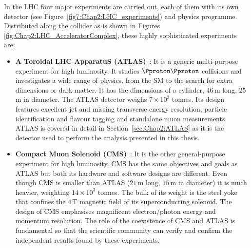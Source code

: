 In the LHC four major experiments are carried out, each of them with its own detector (see Figure~\ref{fig7:Chap2:LHC_experiments})
and physics programme.
Distributed along the collider as is shown in Figures \ref{fig:Chap2:LHC_AcceleratorComplex}, 
these highly sophisticated experiments are:
\begin{itemize}
  \item \textbf{A Toroidal LHC ApparatuS (ATLAS)}~\cite{ATLAS:2008xda}:
  		It is a generic multi-purpose experiment for high luminosity. %
		It studies $\Pproton \Pproton$ collisions and investigates a wide range of physics, from the SM to the search for extra dimensions or
		dark matter. It has the dimensions of a cylinder, $46\,$m long, $25\,$m in diameter. The ATLAS detector weighs $7\times 10^{3}$ tonnes.
		Its design features excellent jet and missing transverse energy resolution, particle identification and flavour tagging
		and standalone muon measurements.  %
		ATLAS is covered in detail in Section~\ref{sec:Chap2:ATLAS} as it is the detector used to perform the analysis presented in
		this thesis.
	
  \item \textbf{Compact Muon Solenoid (CMS)}~\cite{CMS:2008xjf}: 
  		It is the other general-purpose experiment for high luminosity. %
		CMS has the same objectives and goals as ATLAS but both its hardware and software designs are different. 
		Even though CMS is smaller than ATLAS ($21\,$m long, $15\,$m in diameter) it is much heavier, weighting  $14\times 10^{3}$ tonnes.
		The bulk of its weight is the steel yoke that confines the $4\,$T magnetic field of its superconducting solenoid.
		The design of CMS emphasises magnificent electron/photon energy and momentum resolution. 
		The role of the coexistence of CMS and ATLAS is fundamental so that the scientific community 
		can verify and confirm the independent results found by these experiments.
		

\end{itemize}
